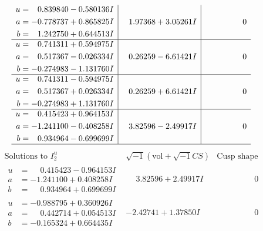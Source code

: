 \documentclass[1p]{elsarticle_modified}
\theoremstyle{definition}
\newcommand{\I}{\sqrt{-1}}
\begin{document}
$$\begin{array}{c|c|c}
\begin{aligned}
u &= \phantom{-}0.839840 - 0.580136 I \\
a &= -0.778737 + 0.865825 I \\
b &= \phantom{-}1.242750 + 0.644513 I\end{aligned}
 & \phantom{-}1.97368 + 3.05261 I & \phantom{-0.000000 } 0 \\ \hline\begin{aligned}
u &= \phantom{-}0.741311 + 0.594975 I \\
a &= \phantom{-}0.517367 - 0.026334 I \\
b &= -0.274983 - 1.131760 I\end{aligned}
 & \phantom{-}0.26259 - 6.61421 I & \phantom{-0.000000 } 0 \\ \hline\begin{aligned}
u &= \phantom{-}0.741311 - 0.594975 I \\
a &= \phantom{-}0.517367 + 0.026334 I \\
b &= -0.274983 + 1.131760 I\end{aligned}
 & \phantom{-}0.26259 + 6.61421 I & \phantom{-0.000000 } 0 \\ \hline\begin{aligned}
u &= \phantom{-}0.415423 + 0.964153 I \\
a &= -1.241100 - 0.408258 I \\
b &= \phantom{-}0.934964 - 0.699699 I\end{aligned}
 & \phantom{-}3.82596 - 2.49917 I & \phantom{-0.000000 } 0\\
 \hline 
 \end{array}$$\newpage$$\begin{array}{c|c|c}  
\text{Solutions to }I^u_{2}& \I (\text{vol} + \sqrt{-1}CS) & \text{Cusp shape}\\
 \hline 
\begin{aligned}
u &= \phantom{-}0.415423 - 0.964153 I \\
a &= -1.241100 + 0.408258 I \\
b &= \phantom{-}0.934964 + 0.699699 I\end{aligned}
 & \phantom{-}3.82596 + 2.49917 I & \phantom{-0.000000 } 0 \\ \hline\begin{aligned}
u &= -0.988795 + 0.360926 I \\
a &= \phantom{-}0.442714 + 0.054513 I \\
b &= -0.165324 + 0.664435 I\end{aligned}
 & -2.42741 + 1.37850 I & \phantom{-0.000000 } 0 \\ \hline\begin{aligned}

\end{aligned}
\end{array}$$
\end{document}

